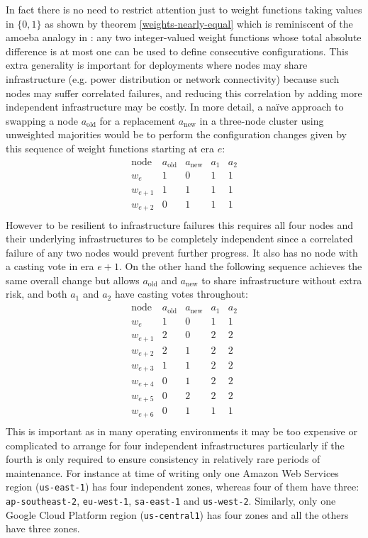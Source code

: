 \documentclass[journal]{IEEEtran}
\begin{document}
In fact there is no need to restrict attention just to weight functions taking
values in $\{0, 1\}$ as shown by theorem \ref{weights-nearly-equal} which is
reminiscent of the amoeba analogy in \cite{cheap-paxos}: any two integer-valued
weight functions whose total absolute difference is at most one can be used to
define consecutive configurations. This extra generality is important for
deployments where nodes may share infrastructure (e.g. power distribution or
network connectivity) because such nodes may suffer correlated failures, and
reducing this correlation by adding more independent infrastructure may be
costly.  In more detail, a na\"ive approach to swapping a node
$a_{\textrm{old}}$ for a replacement $a_{\textrm{new}}$ in a three-node cluster
using unweighted majorities would be to perform the configuration changes given
by this sequence of weight functions starting at era $e$: \[\begin{array}{rcccc}
%
\textrm{node}&a_{\textrm{old}}&a_{\textrm{new}}&a_1&a_2 \\
%
w_e&1&0&1&1\\
%
w_{e+1}&1&1&1&1\\
%
w_{e+2}&0&1&1&1\\
%
\end{array}\]
%
However to be resilient to infrastructure failures this requires all four nodes
and their underlying infrastructures to be completely independent since a
correlated failure of any two nodes would prevent further progress.  It also
has no node with a casting vote in era $e+1$. On the other hand the following
sequence achieves the same overall change but allows $a_{\textrm{old}}$ and
$a_{\textrm{new}}$ to share infrastructure without extra risk, and both $a_1$
and $a_2$ have casting votes throughout: \[\begin{array}{rcccc}
%
\textrm{node}&a_{\textrm{old}}&a_{\textrm{new}}&a_1&a_2 \\
%
w_e&1&0&1&1\\
%
w_{e+1}&2&0&2&2\\
%
w_{e+2}&2&1&2&2\\
%
w_{e+3}&1&1&2&2\\
%
w_{e+4}&0&1&2&2\\
%
w_{e+5}&0&2&2&2\\
%
w_{e+6}&0&1&1&1\\
%
\end{array}\]
%
This is important as in many operating environments it may be too expensive or
complicated to arrange for four independent infrastructures particularly if the
fourth is only required to ensure consistency in relatively rare periods of
maintenance. For instance at time of writing only one Amazon Web Services
region (\texttt{us-east-1}) has four independent zones, whereas four of them
have three: \texttt{ap-southeast-2}, \texttt{eu-west-1}, \texttt{sa-east-1} and
\texttt{us-west-2}. Similarly, only one Google Cloud Platform region
(\texttt{us-central1}) has four zones and all the others have three zones.
\end{document}
